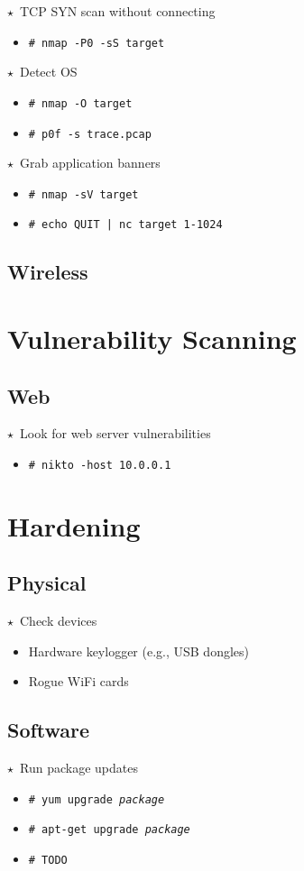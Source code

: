 \documentclass[10pt,landscape]{article}
\newcommand{\os}[1]{\texttt{\footnotesize{#1}}}
\newcommand{\unix}{\os{U}}
\newcommand{\linux}{\os{L}}
\newcommand{\windows}{\os{W}}
\newenvironment{action}[1]
  {\begin{minipage}[c]{\linewidth}$\star$~#1\begin{itemize}[leftmargin=1cm]}
  {\end{itemize}\end{minipage}\vspace*{3pt}}
\newcommand{\cmd}[2]{\item[#1] {\small\tt\# #2}}
\newcommand{\bulletpoint}[1]{\item {\small #1}}
\begin{document}
\begin{multicols*}{3}
\begin{action}{TCP SYN scan without connecting}
\cmd{\unix}{nmap -P0 -sS target}
\end{action}

\begin{action}{Detect OS}
\cmd{\unix}{nmap -O target}
\cmd{\unix}{p0f -s trace.pcap}
\end{action}

\begin{action}{Grab application banners}
\cmd{\unix}{nmap -sV target}
\cmd{\unix}{echo QUIT | nc target 1-1024}
\end{action}

\subsection*{Wireless}

\section*{Vulnerability Scanning}

\subsection*{Web}
\begin{action}{Look for web server vulnerabilities}
\cmd{\unix}{nikto -host 10.0.0.1}
\end{action}

\section*{Hardening}

\subsection*{Physical}

\begin{action}{Check devices}
\bulletpoint{Hardware keylogger (e.g., USB dongles)}
\bulletpoint{Rogue WiFi cards}
\end{action}

\subsection*{Software}

\begin{action}{Run package updates}
  \cmd{\linux}{yum upgrade \emph{package}}
  \cmd{\linux}{apt-get upgrade \emph{package}}
  \cmd{\windows}{TODO}
\end{action}


\end{multicols*}
\end{document}
